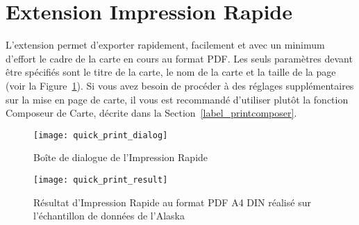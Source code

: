
\section{Extension Impression Rapide}


L'extension  permet d'exporter 
rapidement, facilement et avec un minimum d'effort le cadre de la carte en 
cours au format PDF. Les seuls paramètres devant être spécifiés sont le titre 
de la carte, le nom de la carte et la taille de la page (voir la Figure~\ref{fig:quickprint}). 
Si vous avez besoin de procéder à des réglages supplémentaires sur la mise en 
page de carte, il vous est recommandé d'utiliser plutôt la fonction Composeur 
de Carte, décrite dans la Section~\ref{label_printcomposer}.

\begin{figure}[htb]
\centering
   \texttt{[image: quick\_print\_dialog]}
 \caption{Boîte de dialogue de l'Impression Rapide \nixcaption}\label{fig:quickprint}
\end{figure}

\begin{figure}[htb]
\centering
   \texttt{[image: quick\_print\_result]}
   \caption{Résultat d'Impression Rapide au format PDF A4 DIN réalisé sur 
   l'échantillon de données de l'Alaska\nixcaption}\label{fig:quickprint_result}
\end{figure}